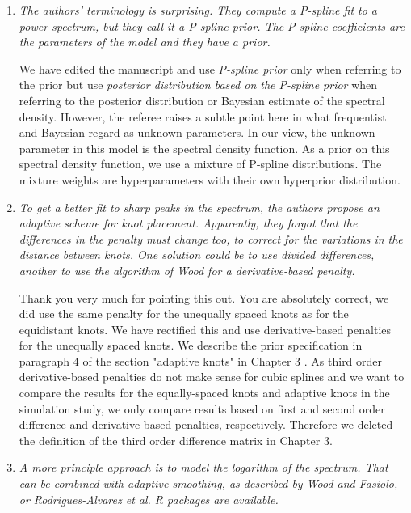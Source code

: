 \documentclass{scrartcl}
\newcommand{\refereeQuote}{\textit }
\newcommand{\response}{}
\begin{document}
\begin{enumerate}
\item
\refereeQuote{The authors' terminology is surprising. They compute a P-spline fit to a power spectrum, but they call it a P-spline prior. The P-spline coefficients are the parameters of the model and they have a prior.}\smallskip

\response{We have edited the manuscript and use {\em P-spline prior} only when referring to the prior but use {\em posterior distribution based on the P-spline prior} when referring to the posterior distribution or Bayesian estimate of the spectral density. However, the referee raises a subtle point here in what frequentist and Bayesian regard as unknown parameters. In our view, the unknown parameter in this model is the spectral density function. As a prior on this spectral density function, we use a mixture of P-spline distributions. The mixture weights are hyperparameters with their own hyperprior distribution.}\bigskip

\item
\refereeQuote{To get a better fit to sharp peaks in the spectrum, the authors propose an adaptive scheme for knot placement. Apparently, they forgot that the differences in the penalty must change too, to correct for the variations in the distance between knots. One solution could be to use divided differences, another to use the algorithm of Wood for a derivative-based penalty.}\smallskip

\response{Thank you very much for pointing this out. You are absolutely correct, we did use the same penalty for the unequally spaced knots as for the equidistant knots.
We have rectified this and use derivative-based penalties for the unequally spaced knots. We describe the prior specification in paragraph 4  of the section  "adaptive knots" in Chapter 3 . As third order derivative-based penalties do not make sense for cubic splines and we want to compare the results for the equally-spaced knots and adaptive knots in the simulation study, we only compare results based on first and second order difference and derivative-based penalties, respectively. Therefore we deleted the definition of the third order difference matrix in Chapter 3. }\bigskip

\item
\refereeQuote{A more principle approach is to model the logarithm of the spectrum. That can be combined with adaptive smoothing, as described by Wood and Fasiolo, or Rodrigues-Alvarez et al. R packages are available.}\smallskip


\end{enumerate}
\end{document}
